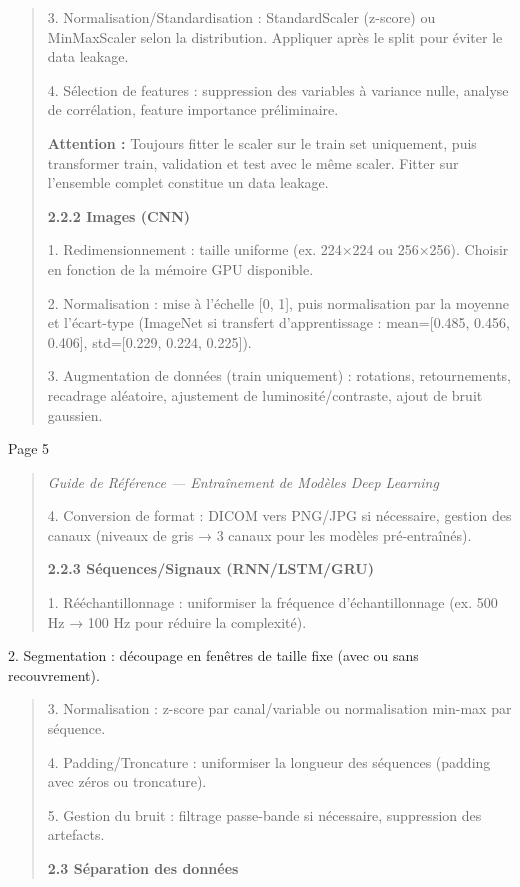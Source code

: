 \documentclass[
]{article}
\begin{document}
\begin{quote}
3. Normalisation/Standardisation : StandardScaler (z-score) ou
MinMaxScaler selon la distribution. Appliquer après le split pour éviter
le data leakage.

4. Sélection de features : suppression des variables à variance nulle,
analyse de corrélation, feature importance préliminaire.

\textbf{Attention :} Toujours fitter le scaler sur le train set
uniquement, puis transformer train, validation et test avec le même
scaler. Fitter sur l'ensemble complet constitue un data leakage.

\textbf{2.2.2 Images (CNN)}

1. Redimensionnement : taille uniforme (ex. 224×224 ou 256×256). Choisir
en fonction de la mémoire GPU disponible.

2. Normalisation : mise à l'échelle {[}0, 1{]}, puis normalisation par
la moyenne et l'écart-type (ImageNet si transfert d'apprentissage :
mean={[}0.485, 0.456, 0.406{]}, std={[}0.229, 0.224, 0.225{]}).

3. Augmentation de données (train uniquement) : rotations,
retournements, recadrage aléatoire, ajustement de luminosité/contraste,
ajout de bruit gaussien.
\end{quote}

Page 5

\begin{quote}
\emph{Guide de Référence --- Entraînement de Modèles Deep Learning}

4. Conversion de format : DICOM vers PNG/JPG si nécessaire, gestion des
canaux (niveaux de gris → 3 canaux pour les modèles pré-entraînés).

\textbf{2.2.3 Séquences/Signaux (RNN/LSTM/GRU)}

1. Rééchantillonnage : uniformiser la fréquence d'échantillonnage (ex.
500 Hz → 100 Hz pour réduire la complexité).
\end{quote}

2. Segmentation : découpage en fenêtres de taille fixe (avec ou sans
recouvrement).

\begin{quote}
3. Normalisation : z-score par canal/variable ou normalisation min-max
par séquence.

4. Padding/Troncature : uniformiser la longueur des séquences (padding
avec zéros ou troncature).

5. Gestion du bruit : filtrage passe-bande si nécessaire, suppression
des artefacts.

\textbf{2.3 Séparation des données}
\end{quote}
\end{document}
